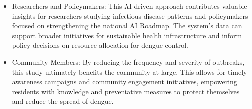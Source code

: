 \begin{itemize} 
	\item Researchers and Policymakers: This AI-driven approach contributes valuable insights for researchers studying infectious disease patterns and policymakers focused on strengthening the national AI Roadmap. The system's data can support broader initiatives for sustainable health infrastructure and inform policy decisions on resource allocation for dengue control.
\end{itemize}


\begin{itemize} 
	\item Community Members: By reducing the frequency and severity of outbreaks, this study ultimately benefits the community at large. This allows for timely awareness campaigns and community engagement initiatives, empowering residents with knowledge and preventative measures to protect themselves and reduce the spread of dengue.
\end{itemize}

